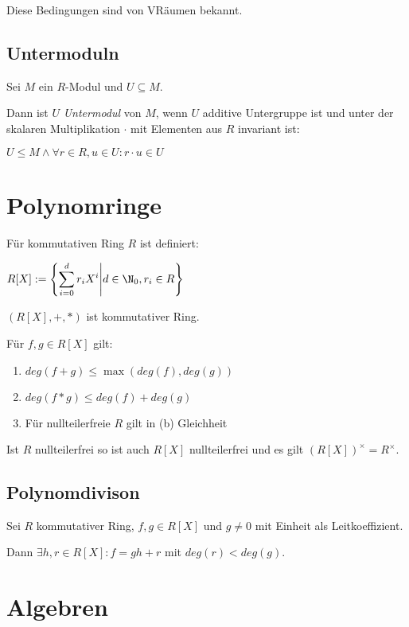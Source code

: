 Diese Bedingungen sind von VRäumen bekannt.

\subsection*{Untermoduln}

Sei $M$ ein $R$-Modul und $U \subseteq M$.

Dann ist $U$ \emph{Untermodul} von $M$, wenn $U$ additive Untergruppe ist und unter der skalaren Multiplikation $\cdot$ mit Elementen aus $R$ invariant ist:

$U \leq M \land \forall r \in R, u \in U : r \cdot u \in U$

\section*{Polynomringe}

Für kommutativen Ring $R$ ist definiert:

$R[X] := \left\{ \displaystyle\sum_{i=0}^d r_i X^i \middle| d \in \N_0, r_i \in R \right\}$

$(R[X], +, *)$ ist kommutativer Ring.

Für $f, g \in R[X]$ gilt:

\begin{enumerate}[label=(\alph*)]
	\item $deg(f+g) \leq \max(deg(f),deg(g))$
	\item $deg(f*g) \leq deg(f) + deg(g)$
	\item Für nullteilerfreie $R$ gilt in (b) Gleichheit
\end{enumerate}

Ist $R$ nullteilerfrei so ist auch $R[X]$ nullteilerfrei und es gilt $(R[X])^\times = R^\times$.

\subsection*{Polynomdivison}

Sei $R$ kommutativer Ring, $f, g \in R[X]$ und $g \neq 0$ mit Einheit als Leitkoeffizient.

Dann $\exists h, r \in R[X] : f = gh+r$ mit $deg(r) < deg(g)$.

\section*{Algebren}

\newcommand{\A}{\mathcal{A}}

